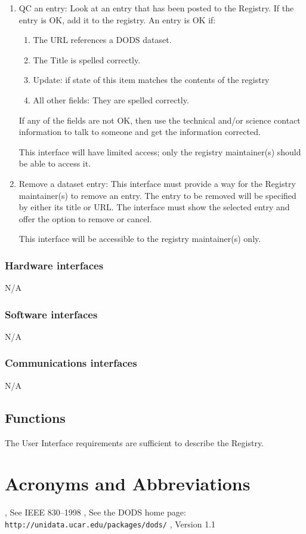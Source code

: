 \documentclass{article}
\begin{document}
\begin{enumerate}
\item QC an entry: Look at an entry that has been posted to the Registry.
  If the entry is OK, add it to the registry. An entry is OK if:
  \begin{enumerate}
  \item The URL references a DODS dataset.
  \item The Title is spelled correctly.
  \item Update: if state of this item matches the contents of the registry
  \item All other fields: They are spelled correctly.
  \end{enumerate}
  If any of the fields are not OK, then use the technical and/or science
  contact information to talk to someone and get the information corrected. 

  This interface will have limited access; only the registry maintainer(s)
  should be able to access it.

\item Remove a dataset entry: This interface must provide a way for the
  Registry maintainer(s) to remove an entry. The entry to be removed will
  be specified by either its title or URL. The interface must show the
  selected entry and offer the option to remove or cancel. 

  This interface will be accessible to the registry maintainer(s) only.
\end{enumerate}

\subsubsection{Hardware interfaces}
N/A
\subsubsection{Software interfaces}
N/A
\subsubsection{Communications interfaces}
N/A

\subsection{Functions}
The User Interface requirements are sufficient to describe the Registry.


\appendix

\section{Acronyms and Abbreviations}
\begin{acronym}
, See IEEE 830--1998
, See the DODS home page:
{\tt http://unidata.ucar.edu/packages/dods/}
, Version 1.1
\end{acronym}
\end{document}
